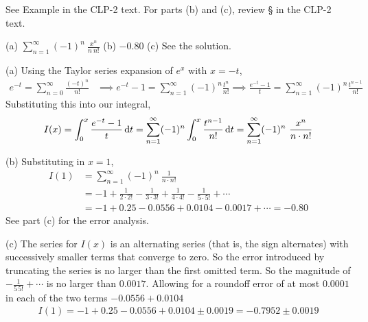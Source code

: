 \begin{hint}
See Example  in the
CLP-2 text.
For parts (b) and (c), review  \S {} in the
CLP-2 text.

\end{hint}

\begin{answer}
(a) $\displaystyle\sum\limits_{n=1}^\infty (-1)^n\ \frac{x^n}{n\ n!}$
\qquad  (b)
$-0.80$
\qquad
(c) See the solution.
\end{answer}

\begin{solution} (a) Using the Taylor series expansion of $e^x$ with $x=-t$,
\begin{align*}
e^{-t} =\sum_{n=0}^\infty \frac{(-t)^n}{n!}
&\implies e^{-t}-1 =\sum_{n=1}^\infty (-1)^n\frac{t^n}{n!}
\implies \frac{e^{-t}-1}{t} =\sum_{n=1}^\infty (-1)^n\frac{t^{n-1}}{n!}
\end{align*}
Substituting this into our integral,
\begin{align*}
I(x)
=\int_0^x\frac{e^{-t}-1}{t}\,\mathrm{d}t
=\sum_{n=1}^\infty (-1)^n\int_0^x \frac{t^{n-1}}{n!}\,\mathrm{d}t
=\sum_{n=1}^\infty (-1)^n\ \frac{x^n}{n\cdot n!}
\end{align*}

\noindent (b)  Substituting in $x=1$,
\begin{align*}
I(1)&=\sum_{n=1}^\infty (-1)^n\ \frac{1}{n\cdot n!}\\
&=-1+\frac{1}{2\cdot 2!}-\frac{1}{3\cdot 3!}+\frac{1}{4\cdot 4!}-\frac{1}{5\cdot 5!}
+\cdots\\
&=-1+0.25-0.0556+0.0104-0.0017+\cdots
=-0.80
\end{align*}
See part (c) for the error analysis.

\noindent (c)
The series for $I(x)$ is an alternating series (that is, the sign alternates)
with successively smaller terms that converge to zero. So the error introduced by truncating
the series is no larger than the first omitted term. So the magnitude of
$-\frac{1}{5\,5!}+\cdots$ is no larger than $0.0017$. Allowing for a roundoff
error of at most $0.0001$ in each of the two terms $-0.0556+0.0104$
\begin{align*}
I(1)=-1+0.25-0.0556+0.0104\pm 0.0019=-0.7952\pm 0.0019
\end{align*}

\end{solution}

